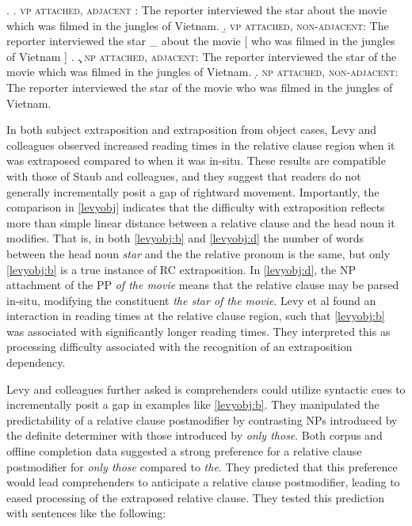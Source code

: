 \documentclass[12pt]{article}
\begin{document}
				\ex.	\label{levyobj}
					\a.	 \textsc{vp attached, adjacent }: The reporter interviewed the star about the movie which was filmed in the jungles of Vietnam.
					\b.	 \label{levyobj:b} \textsc{vp attached, non-adjacent}: The reporter interviewed the star \_ about the movie [ who was filmed in the jungles of Vietnam ] .
					\c.	 \textsc{np attached, adjacent}: The reporter interviewed the star of the movie which was filmed in the jungles of Vietnam.
					\d.	  \label{levyobj:d} \textsc{np attached, non-adjacent}: The reporter interviewed the star of the movie who was filmed in the jungles of Vietnam.
	
	In both subject extraposition and extraposition from object cases, Levy and colleagues observed increased reading times in the relative clause region when it was extraposed compared to when it was in-situ. These results are compatible with those of Staub and colleagues, and they suggest that readers do not generally incrementally posit a gap of rightward movement. Importantly, the comparison in \ref{levyobj} indicates that the difficulty with extraposition reflects more than simple linear distance between a relative clause and the head noun it modifies. That is, in both \ref{levyobj:b} and \ref{levyobj:d} the number of words between the head noun \textit{star} and the the relative pronoun is the same, but only \ref{levyobj:b} is a true instance of RC extraposition. In \ref{levyobj:d}, the NP attachment of the PP \textit{of the movie} means that the relative clause may be parsed in-situ, modifying the constituent \textit{the star of the movie}. Levy et al found an interaction in reading times at the relative clause region, such that \ref{levyobj:b} was associated with significantly longer reading times. They interpreted this as processing difficulty associated with the recognition of an extraposition dependency.

	Levy and colleagues further asked is comprehenders could utilize syntactic cues to incrementally posit a gap in examples like \ref{levyobj:b}. They manipulated the predictability of a relative clause postmodifier by contrasting NPs introduced by the definite determiner with those introduced by \textit{only those}. Both corpus and offline completion data suggested a strong preference for a relative clause postmodifier for \textit{only those} compared to \textit{the}. They predicted that this preference would lead comprehenders to anticipate a relative clause postmodifier, leading to eased processing of the extraposed relative clause. They tested this prediction with sentences like the following:
	
\end{document}
